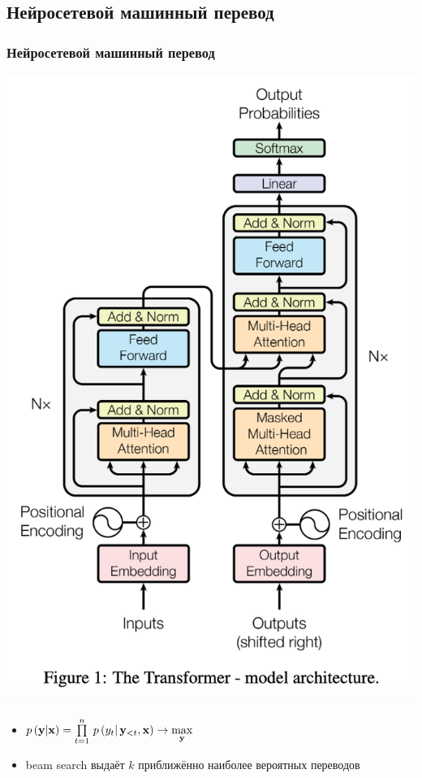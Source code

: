 \documentclass[unicode]{beamer}
\begin{document}
\subsection{Нейросетевой машинный перевод}
\begin{frame}
\frametitle{Нейросетевой машинный перевод}
\begin{center}
    \includegraphics[scale=0.2]{transformer}
\end{center}

\begin{itemize}
    \item $p \, (\bold{y}  |  \bold{x}) = \prod\limits_{t=1}^n \, p \, (y_t | \, \bold{y}_{< t}, \bold{x} ) \rightarrow \max\limits_{\bold{y}}$
    \item beam search выдаёт $k$ приближённо наиболее вероятных переводов
\end{itemize}
\end{frame}
\end{document}
